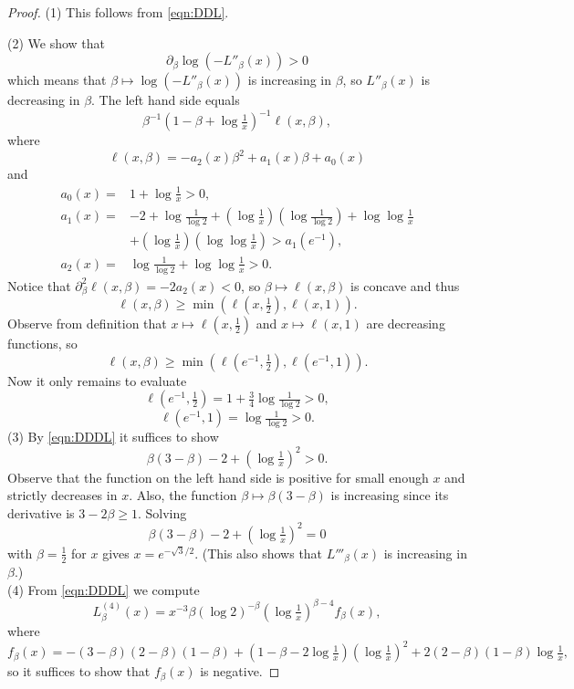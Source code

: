 \documentclass[12pt]{amsart}
\theoremstyle{plain}
\theoremstyle{definition}
\theoremstyle{remark}
\numberwithin{equation}{section}
\begin{document}
\begin{proof}
(1) This follows from \eqref{eqn:DDL}.

(2) We show that
\[ \partial_\beta \log(-L''_\beta(x)) > 0 \]
which means that $\beta\mapsto \log(-L''_\beta(x))$ is increasing in $\beta$, so $L''_\beta(x)$ is decreasing in $\beta$.
The left hand side equals
\[ \beta^{-1}(1-\beta+\log\tfrac1x)^{-1} \ell(x,\beta), \]
where 
\[ \ell(x,\beta)= -a_2(x)\beta^2 + a_1(x)\beta + a_0(x) \]
and
\begin{align*}
a_0(x) = & 1+\log\tfrac1x>0,\\
a_1(x) = &  -2 +
    \log\tfrac1{\log 2} + (\log\tfrac1x) (\log\tfrac1{\log 2}) + \log\log\tfrac1x\\
    &
    + 
    (\log\tfrac1x) (\log\log\tfrac1x) > a_1(e^{-1}) ,\\
a_2(x) =& \log\tfrac1{\log 2}+\log\log\tfrac1x>0.
\end{align*}
Notice that $\partial_\beta^2 \ell(x,\beta)=-2a_2(x)<0$, so $\beta\mapsto \ell(x,\beta)$ is concave and thus
\[ \ell(x,\beta)\ge \min(\ell(x,\tfrac12),\ell(x,1)). \]
Observe from definition that $x\mapsto \ell(x,\tfrac12)$ and $x\mapsto \ell(x,1)$ are decreasing 
functions, so
\[ \ell(x,\beta)\ge \min(\ell(e^{-1},\tfrac12),\ell(e^{-1},1)). \]
Now it only remains to evaluate
\[ \ell(e^{-1},\tfrac12) = 1+\tfrac34 \log \tfrac1{\log 2} > 0,\]
\[\ell(e^{-1},1)=\log\tfrac{1}{\log 2} > 0. \]
(3) By \eqref{eqn:DDDL} it suffices to show
\[ \beta(3-\beta) - 2 + (\log\tfrac1x)^2 > 0. \]
Observe that the function on the left hand side is  positive for small enough $x$ and strictly decreases in $x$.
Also, the function $\beta\mapsto \beta(3-\beta)$ is increasing since its derivative is $3-2\beta\ge 1$.
Solving
\[ \beta(3-\beta) -2 + (\log\tfrac1x)^2 = 0 \]
with $\beta=\frac12$ for $x$ gives $x=e^{-\sqrt{3}/2}$.
(This also shows that $L'''_\beta(x)$ is increasing in $\beta$.)\\

(4) From \eqref{eqn:DDDL} we compute
 \[ L_\beta^{(4)}(x) = x^{-3}\beta  (\log 2)^{-\beta } (\log \tfrac{1}{x})^{\beta -4}  f_\beta(x), \]
 where
 \[ f_\beta(x) = -(3-\beta) (2-\beta) (1-\beta) +  (1-\beta -2 \log \tfrac{1}{x})(\log \tfrac{1}{x})^2 +2 (2-\beta) (1-\beta)\log \tfrac{1}{x}, \]
so it suffices to show that  
$f_\beta(x)$ is negative. 


\end{proof}
\end{document}
